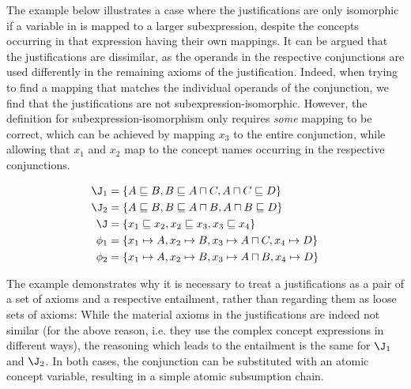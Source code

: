 The example below illustrates a case where the justifications are only isomorphic if a variable in \J is mapped to a larger subexpression, despite the concepts occurring in that expression having their own mappings. It can be argued that the justifications are dissimilar, as the operands in the respective conjunctions are used differently in the remaining axioms of the justification. Indeed, when trying to find a mapping that matches the individual operands of the conjunction, we find that the justifications are not subexpression-isomorphic. However, the definition for subexpression-isomorphism only requires \emph{some} mapping to be correct, which can be achieved by mapping $x_{3}$ to the entire conjunction, while allowing that $x_{1}$ and $x_{2}$ map to the concept names occurring in the respective conjunctions.
\begin{examp}
\begin{align*}
\J_{1}  &=  \{A \sqsubseteq B, B \sqsubseteq A \sqcap C, A \sqcap C \sqsubseteq D \}  \\ 
\J_{2}   &=  \{A \sqsubseteq B, B \sqsubseteq A \sqcap B, A \sqcap B \sqsubseteq D \}  \\ 
\J   &=  \{x_{1} \sqsubseteq x_{2}, x_{2} \sqsubseteq x_{3}, x_{3} \sqsubseteq x_{4} \}  \\ 
\phi_{1}  &=  \{ x_{1} \mapsto A, x_{2} \mapsto B, x_{3} \mapsto A \sqcap C, x_{4} \mapsto D\}\\
\phi_{2}  &= \{ x_{1} \mapsto A, x_{2} \mapsto B, x_{3} \mapsto A \sqcap B, x_{4} \mapsto D \}
\end{align*}
\end{examp}

The example demonstrates why it is necessary to treat a justifications as a pair of a set of axioms and a respective entailment, rather than regarding them as loose sets of axioms: While the material axioms in the justifications are indeed not similar (for the above reason, i.e. they use the complex concept expressions in different ways), the reasoning which leads to the entailment is the same for $\J_{1}$ and $\J_{2}$. In both cases, the conjunction can be substituted with an atomic concept variable, resulting in a simple atomic subsumption chain.




